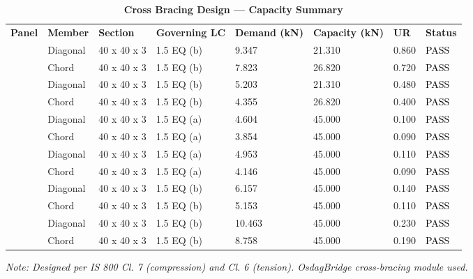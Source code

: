 \documentclass[12pt,a4paper]{report}
\numberwithin{table}{chapter}
\numberwithin{figure}{chapter}
\begin{document}
\vspace{1em}
\begin{longtable}{|C{2.0cm}|L{1.8cm}|C{2.2cm}|C{3.0cm}|C{1.8cm}|C{1.8cm}|C{1.2cm}|C{1.8cm}|}
\caption{\textbf{Cross Bracing Design --- Capacity Summary}} \\
\hline
\endfirsthead
\hline
\caption{\textbf{Cross Bracing Design --- Capacity Summary}} \\
\hline
\endhead
\textbf{Panel} & \textbf{Member} & \textbf{Section} & \textbf{Governing LC} & \textbf{Demand (kN)} & \textbf{Capacity (kN)} & \textbf{UR} & \textbf{Status} \\[6pt]
\hline
{} & Diagonal & 40 x 40 x 3 & 1.5 EQ (b) & 9.347 & 21.310 & 0.860 & \textcolor{black}{PASS} \\[6pt]
 & Chord & 40 x 40 x 3 & 1.5 EQ (b) & 7.823 & 26.820 & 0.720 & \textcolor{black}{PASS} \\[6pt]
\hline
{} & Diagonal & 40 x 40 x 3 & 1.5 EQ (b) & 5.203 & 21.310 & 0.480 & \textcolor{black}{PASS} \\[6pt]
 & Chord & 40 x 40 x 3 & 1.5 EQ (b) & 4.355 & 26.820 & 0.400 & \textcolor{black}{PASS} \\[6pt]
\hline
{} & Diagonal & 40 x 40 x 3 & 1.5 EQ (a) & 4.604 & 45.000 & 0.100 & \textcolor{black}{PASS} \\[6pt]
 & Chord & 40 x 40 x 3 & 1.5 EQ (a) & 3.854 & 45.000 & 0.090 & \textcolor{black}{PASS} \\[6pt]
\hline
{} & Diagonal & 40 x 40 x 3 & 1.5 EQ (a) & 4.953 & 45.000 & 0.110 & \textcolor{black}{PASS} \\[6pt]
 & Chord & 40 x 40 x 3 & 1.5 EQ (a) & 4.146 & 45.000 & 0.090 & \textcolor{black}{PASS} \\[6pt]
\hline
{} & Diagonal & 40 x 40 x 3 & 1.5 EQ (b) & 6.157 & 45.000 & 0.140 & \textcolor{black}{PASS} \\[6pt]
 & Chord & 40 x 40 x 3 & 1.5 EQ (b) & 5.153 & 45.000 & 0.110 & \textcolor{black}{PASS} \\[6pt]
\hline
{} & Diagonal & 40 x 40 x 3 & 1.5 EQ (b) & 10.463 & 45.000 & 0.230 & \textcolor{black}{PASS} \\[6pt]
 & Chord & 40 x 40 x 3 & 1.5 EQ (b) & 8.758 & 45.000 & 0.190 & \textcolor{black}{PASS} \\[6pt]
\hline
\end{longtable}
\noindent\textit{Note: Designed per IS 800 Cl. 7 (compression) and Cl. 6 (tension). OsdagBridge cross-bracing module used.}
\end{document}
